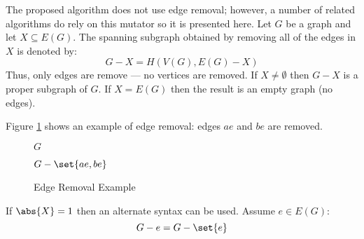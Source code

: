 The proposed algorithm does not use edge removal; however, a number of related algorithms do rely on this mutator
so it is presented here.  Let \(G\) be a graph and let \(X\subseteq E(G)\).  The spanning subgraph obtained by
removing all of the edges in \(X\) is denoted by:
\[G-X=H\left(V(G),E(G)-X\right)\]
Thus, only edges are remove --- no vertices are removed.  If \(X\ne\emptyset\) then \(G-X\) is a proper subgraph of
\(G\).  If \(X=E(G)\) then the result is an empty graph (no edges).

Figure \ref{fig:eremove} shows an example of edge removal: edges \(ae\) and \(be\) are removed.

\begin{figure}[h]
  \label{fig:eremove}
  \begin{minipage}{3in}
    \begin{center}

      \bigskip

      \(G\)
    \end{center}
  \end{minipage}
  \begin{minipage}{3in}
    \begin{center}

      \bigskip

      \(G-\set{ae,be}\)
    \end{center}
  \end{minipage}
  \caption{Edge Removal Example}
\end{figure}

If \(\abs{X}=1\) then an alternate syntax can be used.  Assume \(e\in E(G)\):
\[G-e=G-\set{e}\]


